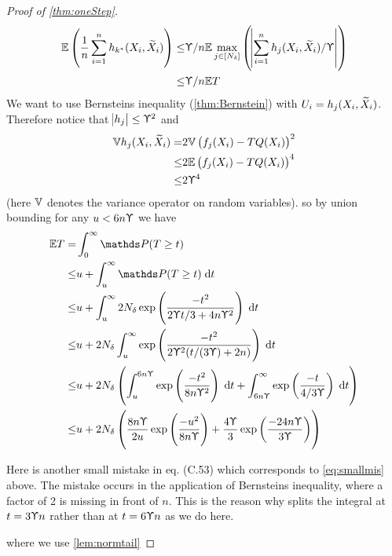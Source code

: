 \begin{proof}[Proof of \cref{thm:oneStep}]
  \begin{align}
    \mathbb{E} \left( \frac{1}{n} \sum_{i=1}^n h_{k^*}(X_i, \widetilde{X}_i) \right)
    \leq & \Upupsilon/n \mathbb{E} \max_{j \in [N_\delta]} \left(
    \abs{\sum_{i=1}^n h_j(X_i, \widetilde{X}_i)/\Upupsilon} \right)
    \\ \leq & \Upupsilon/n \mathbb{E} T 
    \label{eq:havgbound}
  \end{align}
  We want to use Bernsteins inequality (\cref{thm:Bernstein}) with
  $U_i = h_j(X_i,\widetilde{X}_i)$. Therefore notice that
  $\abs{h_j} \leq \Upupsilon^2$ and
  \begin{align}
    \mathbb{V} h_j(X_i, \widetilde{X}_i) = & 2 \mathbb{V} \left( f_j(X_i) - TQ(X_i) \right)^2
    \\ \leq & 2 \mathbb{E} \left( f_j(X_i) - TQ(X_i) \right)^4
    \\ \leq & 2 \Upupsilon^4
    \label{eq:hvarbound}
  \end{align}
  (here $\mathbb{V}$ denotes the variance operator on random variables).
  so by union bounding for any $u < 6 n \Upupsilon$ we have
  \begin{align}
    \E T = & \int_0^\infty \Prob(T \geq t)
    \\ \leq & u + \int_u^\infty \Prob(T \geq t) \difd t
    \\ \leq & u + \int_u^\infty 2 N_\delta
    \exp \left( \frac{-t^2}{2 \Yp t/3 + 4n \Yp^2} \right) \difd t
    \label{eq:smallmis}
    \\ \leq & u + 2 N_\delta \int_u^\infty 
    \exp \left( \frac{-t^2}{2 \Yp^2 (t/(3 \Yp) + 2 n )} \right) \difd t
    \\ \leq & u + 2 N_\delta \left(
      \int_u^{6 n \Yp} \exp \left( \frac{-t^2}{8 n \Yp^2} \right) \difd t
      + \int_{6 n \Yp}^\infty \exp \left( \frac{-t}{4/3 \Yp} \right) \difd t
    \right) 
    \label{eq:prenormtail}
    \\ \leq & u + 2 N_\delta \left(
      \frac{8 n \Yp}{2 u} \exp\left( \frac{-u^2}{8 n \Yp} \right)
      + \frac{4 \Yp}{3} \exp\left( \frac{-24 n \Yp}{3 \Yp} \right)
    \right) 
    \label{eq:ETboundu}
  \end{align}
  \begin{rem}
    Here is another small mistake in  eq. (C.53)
    which corresponds to \cref{eq:smallmis} above.
    The mistake occurs in the application of Bernsteins inequality,
    where a factor of 2 is missing in front of $n$.
    This is the reason why  splits the integral at
    $t=3\Upupsilon n$ rather than at $t=6\Upupsilon n$ as we do here.
    \label{rem:mistake2}
  \end{rem}
  where we use \cref{lem:normtail}

\end{proof}
